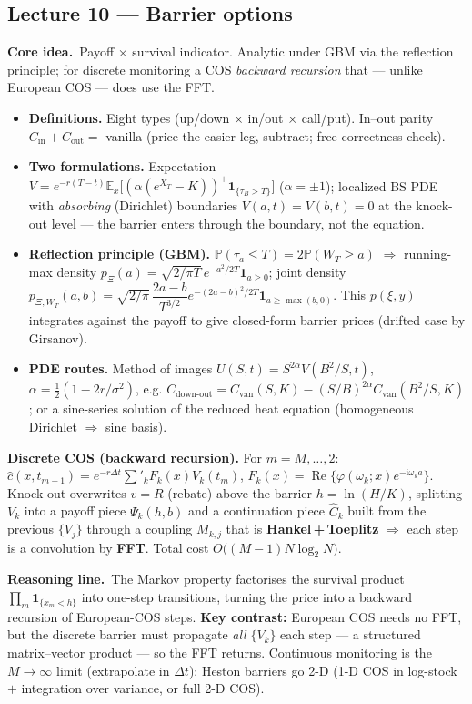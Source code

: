 \documentclass[11pt]{article}
\newcommand{\E}{\mathbb{E}}
\newcommand{\Prob}{\mathbb{P}}
\newcommand{\Real}{\operatorname{Re}}
\newcommand{\ii}{\mathrm{i}}
\newcommand{\ch}{\varphi}
\newcommand{\Max}{\Xi}
\newcommand{\om}{\omega_k}
\newcommand{\lec}[2]{\subsection*{Lecture #1 --- #2}\addcontentsline{toc}{subsection}{Lecture #1 --- #2}}
\newcommand{\core}[1]{\noindent\textbf{Core idea.}\ #1\par\smallskip}
\newcommand{\why}[1]{\smallskip\noindent\textbf{Reasoning line.}\ #1\par}
\begin{document}
\lec{10}{Barrier options}
\core{Payoff $\times$ survival indicator. Analytic under GBM via the reflection principle; for discrete
monitoring a COS \emph{backward recursion} that --- unlike European COS --- does use the FFT.}
\begin{itemize}
  \item \textbf{Definitions.} Eight types (up/down $\times$ in/out $\times$ call/put). In--out parity
  $C_{\text{in}}+C_{\text{out}}=$ vanilla (price the easier leg, subtract; free correctness check).
  \item \textbf{Two formulations.} Expectation $V=e^{-r(T-t)}\E_x\big[(\alpha(e^{X_T}-K))^+\mathbf
  1_{\{\tau_B>T\}}\big]$ ($\alpha=\pm1$); localized BS PDE with \emph{absorbing} (Dirichlet) boundaries
  $V(a,t)=V(b,t)=0$ at the knock-out level --- the barrier enters through the boundary, not the equation.
  \item \textbf{Reflection principle (GBM).} $\Prob(\tau_a\le T)=2\Prob(W_T\ge a)$ $\Rightarrow$ running-max
  density $p_{\Max}(a)=\sqrt{2/\pi T}\,e^{-a^2/2T}\mathbf 1_{a\ge0}$; joint density
  $p_{\Max,W_T}(a,b)=\sqrt{2/\pi}\,\dfrac{2a-b}{T^{3/2}}e^{-(2a-b)^2/2T}\mathbf 1_{a\ge\max(b,0)}$. This $p(\xi,y)$
  integrates against the payoff to give closed-form barrier prices (drifted case by Girsanov).
  \item \textbf{PDE routes.} Method of images $U(S,t)=S^{2\alpha}V(B^2/S,t)$, $\alpha=\tfrac12(1-2r/\sigma^2)$,
  e.g. $C_{\text{down-out}}=C_{\text{van}}(S,K)-(S/B)^{2\alpha}C_{\text{van}}(B^2/S,K)$; or a sine-series
  solution of the reduced heat equation (homogeneous Dirichlet $\Rightarrow$ sine basis).
\end{itemize}
\begin{key}
\textbf{Discrete COS (backward recursion).} For $m=M,\dots,2$:
$\hat c(x,t_{m-1})=e^{-r\Delta t}\sum'_k F_k(x)V_k(t_m)$, $F_k(x)=\Real\{\ch(\om;x)e^{-\ii\om a}\}$. Knock-out
overwrites $v=R$ (rebate) above the barrier $h=\ln(H/K)$, splitting $V_k$ into a payoff piece $\Psi_k(h,b)$ and
a continuation piece $\hat C_k$ built from the previous $\{V_j\}$ through a coupling $M_{k,j}$ that is
\textbf{Hankel\,+\,Toeplitz} $\Rightarrow$ each step is a convolution by \textbf{FFT}. Total cost
$O\big((M-1)N\log_2 N\big)$.
\end{key}
\why{The Markov property factorises the survival product $\prod_m\mathbf 1_{\{x_m<h\}}$ into one-step
transitions, turning the price into a backward recursion of European-COS steps. \textbf{Key contrast:} European
COS needs no FFT, but the discrete barrier must propagate \emph{all} $\{V_k\}$ each step --- a structured
matrix--vector product --- so the FFT returns. Continuous monitoring is the $M\to\infty$ limit (extrapolate in
$\Delta t$); Heston barriers go 2-D (1-D COS in log-stock $+$ integration over variance, or full 2-D COS).}
\end{document}
